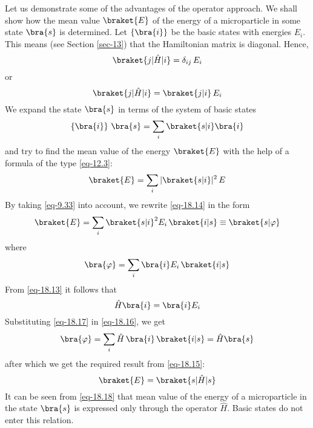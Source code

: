 \documentclass[a4paper,sfsidenotes,colorlinks=true]{tufte-book}
\numberwithin{equation}{section}
\numberwithin{figure}{section}
\begin{document}
Let us demonstrate some of the advantages
of the operator approach. We shall show how the mean value $\braket{E}$ of
the energy of a microparticle in some state $\bra{s}$ is determined. Let
$\left\{\bra{i}\right\}$ be the basic states with energies $E_{i}$. This means (see
Section \ref{sec-13}) that the Hamiltonian matrix is diagonal. Hence,
\begin{equation*}%
\braket{j| \hat{H}| i} = \delta_{ij} \, E_{i}
\end{equation*}
or 
\begin{equation}%
\braket{j| \hat{H}| i} = \braket{j|i} \, E_{i}
\label{eq-18.13} 
\end{equation}
We expand the state $\bra{s}$ in terms of the system of basic states
\begin{equation*}%
\left\{\bra{i} \right\} \, \bra{s} = \sum_{i} \braket{s|i} \bra{i}
\end{equation*}
and try to find the mean value of the energy $\braket{E}$ with the help of a formula of the type \ref{eq-12.3}:
\begin{equation}%
\braket{E} = \sum_{i} |\braket{s|i}|^{2} \, E
\label{eq-18.14}
\end{equation}
By taking \ref{eq-9.33} into account, we rewrite \ref{eq-18.14} in the
form 
\begin{equation}%
\braket{E} = \sum_{i} \braket{s|i}^{2} E_{i} \, \braket{i|s} \equiv \braket{s|\varphi}
\label{eq-18.15}
\end{equation}
where 
\begin{equation}%
\bra{\varphi} = \sum_{i} \bra{i} E_{i} \, \braket{i|s}
\label{eq-18.16}
\end{equation}
From \ref{eq-18.13} it follows that 
\begin{equation}%
\hat{H} \bra{i} = \bra{i} E_{i}
\label{eq-18.17}
\end{equation}
Substituting \ref{eq-18.17} in \ref{eq-18.16}, we get
\begin{equation*}%
\bra{\varphi} = \sum_{i} \hat{H} \, \bra{i} \, \braket{i|s} = \hat{H} \bra{s}
\end{equation*}
after which we get the required result from \ref{eq-18.15}:
\begin{equation}%
\braket{E} = \braket{s|\hat{H}| s}
\label{eq-18.18}
\end{equation}
It can be seen from \ref{eq-18.18} that mean value of the energy of a
microparticle in the state $\bra{s}$ is expressed only through the operator
$\hat{H}$. Basic states do not enter this relation. 
\end{document}
